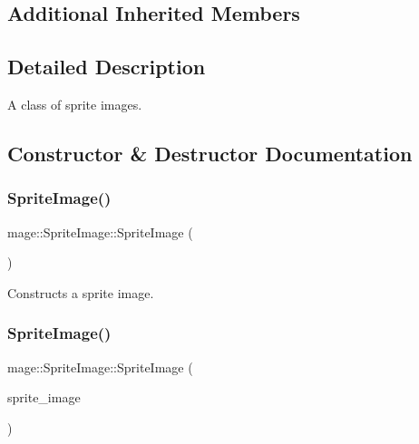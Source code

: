 \subsection*{Additional Inherited Members}


\subsection{Detailed Description}
A class of sprite images. 

\subsection{Constructor \& Destructor Documentation}
\hypertarget{classmage_1_1_sprite_image_ac5de26e66bf1d1fdd255c2044f097ecf}{}\label{classmage_1_1_sprite_image_ac5de26e66bf1d1fdd255c2044f097ecf} 
\subsubsection{\texorpdfstring{Sprite\+Image()}{SpriteImage()}\hspace{0.1cm}{\footnotesize\ttfamily [1/3]}}
{\footnotesize\ttfamily mage\+::\+Sprite\+Image\+::\+Sprite\+Image (\begin{DoxyParamCaption}{ }\end{DoxyParamCaption})}

Constructs a sprite image. \hypertarget{classmage_1_1_sprite_image_a7ce3b568dc3ff96e7467a8d00bba997d}{}\label{classmage_1_1_sprite_image_a7ce3b568dc3ff96e7467a8d00bba997d} 
\subsubsection{\texorpdfstring{Sprite\+Image()}{SpriteImage()}\hspace{0.1cm}{\footnotesize\ttfamily [2/3]}}
{\footnotesize\ttfamily mage\+::\+Sprite\+Image\+::\+Sprite\+Image (\begin{DoxyParamCaption}\item[{const \hyperlink{classmage_1_1_sprite_image}{Sprite\+Image} \&}]{sprite\+\_\+image }\end{DoxyParamCaption})}


